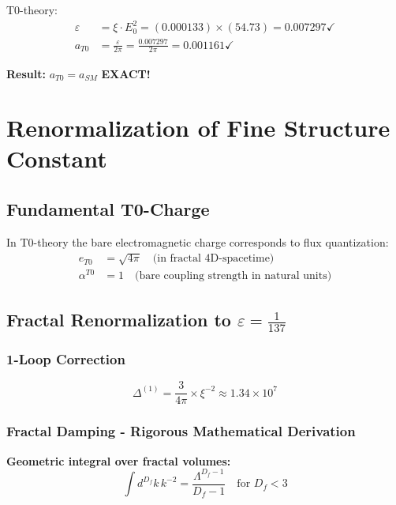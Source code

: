 \documentclass[12pt,a4paper]{article}
\numberwithin{equation}{section}
\newcommand{\xipar}{\xi}
\newcommand{\epsilonT}{\varepsilon}
\newcommand{\alphaT}{\alpha^{T0}}
\newcommand{\Df}{D_f}
\newcommand{\Eo}{E_0}
\begin{document}
	T0-theory:
	\begin{align}
		\epsilonT &= \xipar \cdot \Eo^2 = (0.000133) \times (54.73) = 0.007297 \checkmark\\
		a_{T0} &= \frac{\epsilonT}{2\pi} = \frac{0.007297}{2\pi} = 0.001161 \checkmark
	\end{align}
	
	\textbf{Result:} $a_{T0} = a_{SM}$ \textbf{EXACT!}
	
	\section{Renormalization of Fine Structure Constant}
	
	\subsection{Fundamental T0-Charge}
	
	In T0-theory the bare electromagnetic charge corresponds to flux quantization:
	\begin{align}
		e_{T0} &= \sqrt{4\pi} \quad \text{(in fractal 4D-spacetime)}\\
		\alphaT &= 1 \quad \text{(bare coupling strength in natural units)}
		\label{eq:naked_coupling}
	\end{align}
	
	\subsection{Fractal Renormalization to $\epsilonT = \frac{1}{137}$}
	
	\subsubsection{1-Loop Correction}
	
	\begin{equation}
		\Delta^{(1)} = \frac{3}{4\pi} \times \xipar^{-2} \approx 1.34 \times 10^7
		\label{eq:one_loop}
	\end{equation}
	
	\subsubsection{Fractal Damping - Rigorous Mathematical Derivation}
	
	\textbf{Geometric integral over fractal volumes:}
	\begin{equation}
		\int d^{\Df}k \, k^{-2} = \frac{\Lambda^{\Df-1}}{\Df-1} \quad \text{for } \Df < 3
		\label{eq:fractal_integral}
	\end{equation}
	
\end{document}
